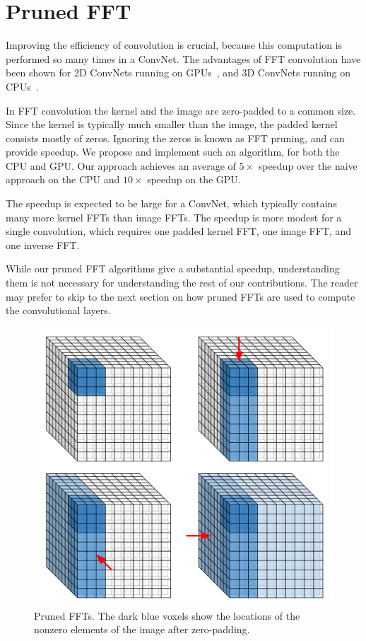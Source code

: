 \documentclass[conference]{./IEEEtran/IEEEtran}
\begin{document}
\section{Pruned FFT}

  Improving the efficiency of convolution is crucial, because this
  computation is performed so many times in a ConvNet.  The advantages
  of FFT convolution have been shown for 2D ConvNets running on
  GPUs~\cite{mathieu-iclr-14,vasilache2014fast}, and 3D ConvNets
  running on CPUs~\cite{zlateski2015znn}.

  In FFT convolution the kernel and the image are zero-padded to a
  common size.  Since the kernel is typically much smaller than the
  image, the padded kernel consists mostly of zeros.  Ignoring the
  zeros is known as FFT pruning, and can provide speedup.  We propose
  and implement such an algorithm, for both the CPU and GPU. Our
  approach achieves an average of $5 \times$ speedup over the naive
  approach on the CPU and $10 \times$ speedup on the GPU.

  The speedup is expected to be large for a ConvNet, which typically
  contains many more kernel FFTs than image FFTs.  The speedup is more
  modest for a single convolution, which requires one padded kernel
  FFT, one image FFT, and one inverse FFT.

  While our pruned FFT algorithms give a substantial speedup,
  understanding them is not necessary for understanding the rest of
  our contributions.  The reader may prefer to skip to the next
  section on how pruned FFTs are used to compute the convolutional
  layers.

  \begin{figure}
    \begin{center}
      \includegraphics[width=0.55\columnwidth]{fig/pruned_ffts.pdf}
    \end{center}
    \caption{Pruned FFTs. The dark blue voxels show the locations of
      the nonzero elements of the image after zero-padding. }
    \label{fig:pruned_ffts}
  \end{figure}
\end{document}
